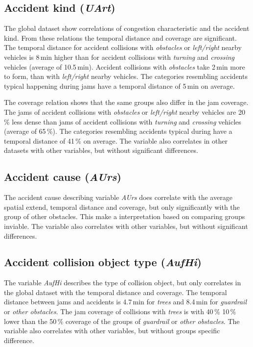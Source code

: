 \subsection{Accident kind (\textit{UArt})}
The global dataset show correlations of congestion characteristic and the accident kind. From these relations the temporal distance and coverage are significant. The temporal distance for accident collisions with \textit{obstacles} or \textit{left/right} nearby vehicles is 8\,min higher than for accident collisions with \textit{turning} and \textit{crossing} vehicles (average of 10.5\,min). Accident collisions with \textit{obstacles} take 2\,min more to form, than with \textit{left/right} nearby vehicles. The categories resembling accidents typical happening during jams have a temporal distance of 5\,min on average.

The coverage relation shows that the same groups also differ in the jam coverage. The jams of accident collisions with \textit{obstacles} or \textit{left/right} nearby vehicles are 20\,\% less dense than jams of accident collisions with \textit{turning} and \textit{crossing} vehicles (average of 65\,\%). The categories resembling accidents typical during have a temporal distance of 41\,\% on average. The variable also correlates in other datasets with other variables, but without significant differences.

\subsection{Accident cause (\textit{AUrs})}
The accident cause describing variable \textit{AUrs} does correlate with the average spatial extend, temporal distance and coverage, but only significantly with the group of other obstacles. This make a interpretation based on comparing groups inviable. The variable also correlates with other variables, but without significant differences.

\subsection{Accident collision object type (\textit{AufHi})}
The variable \textit{AufHi} describes the type of collision object, but only correlates in the global dataset with the temporal distance and coverage. The temporal distance between jams and accidents is 4.7\,min for \textit{trees} and 8.4\,min for \textit{guardrail} or \textit{other obstacles}. The jam coverage of collisions with \textit{trees} is with 40\,\% 10\,\% lower than the 50\,\% coverage of the groups of \textit{guardrail} or \textit{other obstacles}. The variable also correlates with other variables, but without groups specific difference.

